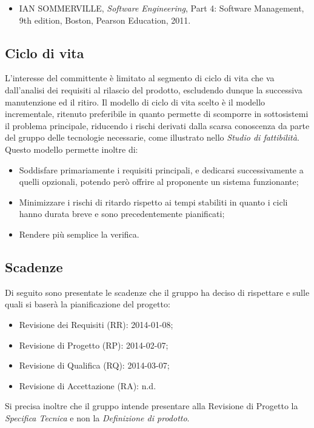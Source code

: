 		\begin{itemize}
		\item IAN SOMMERVILLE, \textit{Software Engineering}, Part 4: Software Management, 9th edition, Boston, Pearson Education, 2011.
		\end{itemize}
		
	\pagebreak
	\subsection{Ciclo di vita}
	L'interesse del committente è limitato al segmento di ciclo di vita che va dall'analisi dei requisiti al rilascio del prodotto, escludendo dunque la successiva manutenzione ed il ritiro.
	Il modello di ciclo di vita scelto è il modello incrementale, ritenuto preferibile in quanto permette di scomporre in sottosistemi il problema principale, riducendo i rischi derivati dalla scarsa conoscenza da parte del gruppo delle tecnologie necessarie, come illustrato nello \textit{Studio di fattibilità}.
	Questo modello permette inoltre di:
	\begin{itemize}
	\item Soddisfare primariamente i requisiti principali, e dedicarsi successivamente a quelli opzionali, potendo però offrire al proponente un sistema funzionante;
	\item Minimizzare i rischi di ritardo rispetto ai tempi stabiliti in quanto i cicli hanno durata breve e sono precedentemente pianificati;
	\item Rendere più semplice la verifica.
	\end{itemize}
	\subsection{Scadenze}
	Di seguito sono presentate le scadenze che il gruppo ha deciso di rispettare e sulle quali si baserà la pianificazione del progetto:
	\begin{itemize}
	\item Revisione dei Requisiti (RR): 2014-01-08;
	\item Revisione di Progetto (RP): 2014-02-07;
	\item Revisione di Qualifica (RQ): 2014-03-07;
	\item Revisione di Accettazione (RA): n.d.
	\end{itemize}
	Si precisa inoltre che il gruppo intende presentare alla Revisione di Progetto la \textit{Specifica Tecnica} e non la \textit{Definizione di prodotto}.

